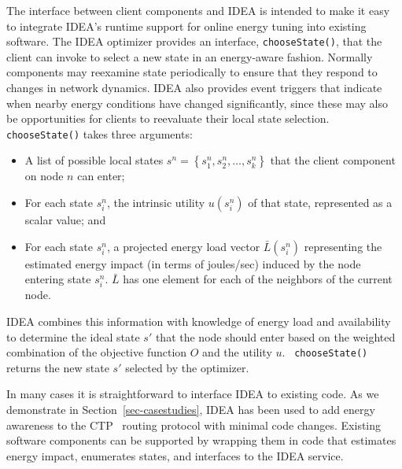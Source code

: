 The interface between client components and IDEA is intended to
make it easy to integrate IDEA's runtime support for online energy
tuning into existing software. The IDEA optimizer provides an
interface, {\tt chooseState()}, that the client can invoke to select
a new state in an energy-aware fashion. Normally components may reexamine
state periodically to ensure that they respond to changes in network
dynamics. IDEA also provides event triggers that indicate when nearby energy
conditions have changed significantly, since these may also be opportunities
for clients to reevaluate their local state selection.
{\tt chooseState()} takes three arguments:
\begin{itemize}
\item A list of possible local states $s^n = \left\{ s^n_1, s^n_2, \ldots,
s^n_k\right\}$ that the client component on node $n$ can enter;
\item For each state $s^n_i$, the intrinsic utility $u(s^n_i)$ of that state,
represented as a scalar value; and
\item For each state $s^n_i$, a projected energy load vector $\bar{L}(s^n_i)$
representing the estimated energy impact (in terms of joules/sec) induced by
the node entering state $s^n_i$. $\bar{L}$ has one element for each of the
neighbors of the current node. 
\end{itemize}
IDEA combines this information with knowledge of energy load and availability
to determine the ideal state $s'$ that the node should enter based on the
weighted combination of the objective function $O$ and the utility $u$.  {\tt
chooseState()} returns the new state $s'$ selected by the optimizer.

In many cases it is straightforward to interface IDEA to existing code. As we
demonstrate in Section~\ref{sec-casestudies}, IDEA has been used to add
energy awareness to the CTP~\cite{ctp-sensys09} routing protocol with minimal
code changes.  Existing software components can be supported by wrapping them
in code that estimates energy impact, enumerates states, and interfaces to
the IDEA service.
